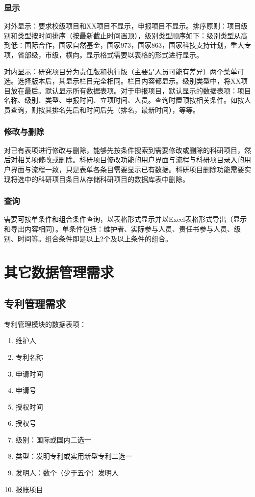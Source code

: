 \subsubsection{显示}
\label{projectview}
对外显示：要求校级项目和XX项目不显示，申报项目不显示。排序原则：项目级别和类型按时间排序（按最新截止时间置顶），级别类型顺序如下：级别类型从高到低：国际合作，国家自然基金，国家973，国家863，国家科技支持计划，重大专项，省部级，市级，横向。显示格式需要以表格的形式进行显示。

对内显示：研究项目分为责任版和执行版（主要是人员可能有差异）两个菜单可选。选择版本后，其显示栏目完全相同。栏目内容都显示。级别类型中，将XX项目放在最后。默认显示所有数据表项。对于申报项目，默认显示的数据表项：项目名称、级别、类型、申报时间、立项时间、人员。查询时置顶按相关条件。如按人员查询，则按其排名先后和时间后先（排名，最新时间），等等。

\subsubsection{修改与删除}
\label{projectupdate}
对已有表项进行修改与删除，能够先按条件搜索到需要修改或删除的科研项目，然后对相关项修改或删除。科研项目修改功能的用户界面与流程与科研项目录入的用户界面与流程一致，只是表单各条目需要显示已有数据。科研项目删除功能需要实现将选中的科研项目条目从存储科研项目的数据库表中删除。

\subsubsection{查询}
\label{projectsearch}
需要可按单条件和组合条件查询，以表格形式显示并以Excel表格形式导出（显示和导出内容相同）。单条件包括：维护者、实际参与人员、责任书参与人员、级别、时间等。组合条件即是以上2个及以上条件的组合。

\section{其它数据管理需求}
\subsection{专利管理需求}

专利管理模块的数据表项：

\begin{enumerate}
\item 维护人
\item 专利名称
\item 申请时间
\item 申请号
\item 授权时间
\item 授权号
\item 级别：国际或国内二选一
\item 类型：发明专利或实用新型专利二选一
\item 发明人：数个（少于五个）发明人
\item 报账项目
\end{enumerate}

